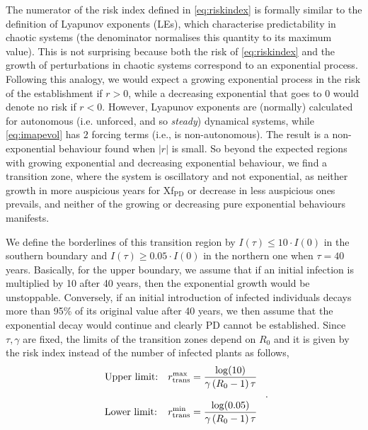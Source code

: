 The numerator of the risk index defined in \cref{eq:riskindex} is formally
similar to the definition of Lyapunov exponents (LEs), which characterise
predictability in chaotic systems (the denominator normalises this quantity to
its maximum value). This is not surprising because both the risk of
\cref{eq:riskindex} and the growth of perturbations in chaotic systems
correspond to an exponential process.
Following this analogy, we would expect a growing exponential process in
the risk of the establishment if $r>0$, while a decreasing exponential that
goes to $0$ would denote no risk if $r<0$.
However, Lyapunov exponents are (normally) calculated for autonomous (i.e.
unforced, and so \textit{steady}) dynamical systems, while \cref{eq:imapevol}
has $2$ forcing terms (i.e., is non-autonomous).
The result is a non-exponential behaviour found when $|r|$ is small. So
beyond the expected regions with growing exponential and decreasing exponential
behaviour, we find a transition zone, where the system is oscillatory and not
exponential, as neither growth in more auspicious years for Xf$_{\textrm{PD}}$
or decrease in less auspicious ones prevails, and neither of the growing or
decreasing pure exponential behaviours manifests.

We define the borderlines of this transition region by $I(\tau)\leq10 \cdot
    I(0)$ in the southern boundary and $I(\tau)\geq 0.05 \cdot I(0)$ in the
northern one when $\tau=40$ years. Basically, for the upper boundary, we assume
that if an initial infection is multiplied by 10 after 40 years, then the
exponential growth would be unstoppable. Conversely, if an initial introduction
of infected individuals decays more than 95\% of its original value after 40
years, we then assume that the exponential decay would continue and clearly PD
cannot be established. Since $\tau, \gamma$ are fixed, the limits of the
transition zones depend on $R_0 $ and it is given by the risk index instead of
the number of infected plants as follows,
\begin{equation}
    \begin{array}{ll}
        \displaystyle \textrm{Upper limit:} & \displaystyle

        r_{\textrm{trans}}^{\textrm{max}}=\frac{\log(10)}{\gamma\left(R_0-1\right)\tau}
        \\\\
        \displaystyle \textrm{Lower limit:} & \displaystyle

        r_{\textrm{trans}}^{\textrm{min}}=\frac{\log(0.05)}{\gamma\left(R_0-1\right)\tau}
    \end{array} \ .
\end{equation}

